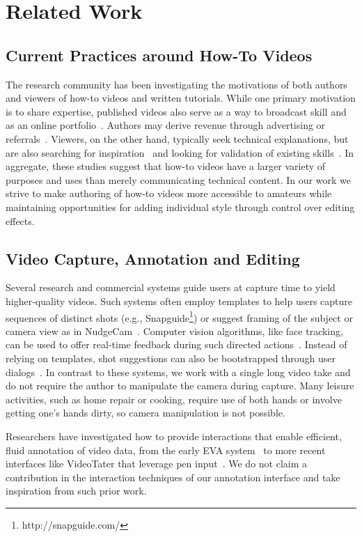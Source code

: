\section{Related Work}

\subsection{Current Practices around How-To Videos}
The research community has been investigating the motivations of both authors and viewers of how-to videos and written tutorials. While one primary motivation is to share expertise, published videos also serve as a way to broadcast skill and as an online portfolio~\cite{Torrey:2007he}. Authors may derive revenue through advertising or referrals~\cite{Lafreniere:2012tl}. Viewers, on the other hand, typically seek technical explanations, but are also searching for inspiration~\cite{Torrey:2009fc} and looking for validation of existing skills~\cite{Lafreniere:2012tl}.
In aggregate, these studies suggest that how-to videos have a larger variety of purposes and uses than merely communicating technical content.
In our work we strive to make authoring of how-to videos more accessible to amateurs while maintaining opportunities for adding individual style through control over editing effects.

\subsection{Video Capture, Annotation and Editing}
 Several research and commercial systems guide users at capture time to yield higher-quality videos. Such systems often employ templates to help users capture sequences of distinct shots (e.g., Snapguide\footnote{http://snapguide.com/}) or suggest framing of the subject or camera view as in NudgeCam~\cite{Carter:2010}. Computer vision algorithms, like face tracking, can be used to offer real-time feedback during such directed actions~\cite{Davis:2003cu,Heer:2004ba,Carter:2010}. Instead of relying on templates, shot suggestions can also be bootstrapped through user dialogs~\cite{Adams:2005}. In contrast to these systems, we work with a single long video take and do not require the author to manipulate the camera during capture. Many leisure activities, such as home repair or cooking, require use of both hands or involve getting one's hands dirty, so camera manipulation is not possible.

 Researchers have investigated how to provide interactions that enable efficient, fluid annotation of video data, from the early EVA system~\cite{Mackay:1989} to more recent interfaces like VideoTater that leverage pen input~\cite{Diakopoulos:2006vt}. We do not claim a contribution in the interaction techniques of our annotation interface and take inspiration from such prior work.

